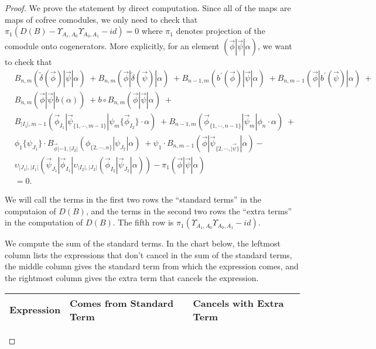 \begin{proof}
We prove the statement by direct computation. 
Since all of the maps are maps of cofree comodules, 
we only need to check that $\pi_1(D(B) - 
\Upsilon_{A_1,A_0}\Upsilon_{A_0,A_1} - id) = 0$ 
where $\pi_1$ denotes projection of the comodule 
onto cogenerators. More explicitly, for an element 
$(\vec{\phi}|\vec{\psi}|\alpha)$, we want to check that
\begin{equation} \label{eq:upsilon_homotopy}
\begin{aligned}
&B_{n, m} ( \tilde{\delta}(\vec{\phi}) | \vec{\psi} | \alpha ) \; + 
B_{n, m} ( \vec{\phi} | \tilde{\delta}(\vec{\psi}) | \alpha ) \; + 
B_{n-1, m} ( b^\prime(\vec{\phi}) | \vec{\psi} | \alpha ) \; + 
B_{n, m-1} ( \vec{\phi} | b^\prime(\vec{\psi}) | \alpha ) \; + \\
&B_{n, m} ( \vec{\phi} | \vec{\psi} | b(\alpha) ) \; + 
b \circ B_{n, m} ( \vec{\phi} | \vec{\psi} | \alpha ) \; + \\
&B_{|I_1|, m-1}(\vec{\phi}_{I_1} | \vec{\psi}_{\{1,\cdots, m-1\}} | \psi_{m} \{\vec{\phi}_{I_2}\}\cdot \alpha ) \; + 
B_{n-1, m}(\vec{\phi}_{\{1,\cdots, n-1\}} |\vec{\psi}_{m} | \phi_{n} \cdot \alpha) \; + \\
&\phi_1 \{ \psi_{J_1}\} \cdot B_{\vec{\phi}|-1, |J_2|}(\phi_{\{2,\cdots , n\}} | \psi_{J_2} | \alpha ) \; + 
\psi_1 \cdot B_{n,m-1} ( \vec{\phi} | \vec{\psi}_{\{2,\cdots, |\vec{\psi}\}} | \alpha)  - \\ 
&\upsilon_{|J_1|, |I_1|} (\vec{\psi}_{J_1} | \vec{\phi}_{I_1} | \upsilon_{|I_2|, |J_2|} (\vec{\phi}_{I_2} | \vec{\psi}_{J_2} | \alpha ))  - \pi_1(\vec{\phi} | \vec{\psi} | \alpha) \\
&= 0.
\end{aligned}
\end{equation}

We will call the terms in the first two rows the ``standard terms'' in the computaion of $D(B)$, and the terms in the second two rows the ``extra terms'' in the computation of $D(B)$. The fifth row is $\pi_1(\Upsilon_{A_1,A_0}\Upsilon_{A_0,A_1} - id)$. 

We compute the sum of the standard terms. In the chart below, the leftmost column lists the expressions that don't cancel in the sum of the standard terms, the middle column gives the standard term from which the expression comes, and the rightmost column gives the extra term that cancels the expression. 

\newpage

\begin{landscape}
\begin{center}
  \begin{tabular}{ p{3.25in} | p{2in} | p{2.5in} }
    \hline
    Expression & Comes from Standard Term & Cancels with Extra Term \\ \hline


\end{tabular}
\end{center}
\end{landscape}
\end{proof}
